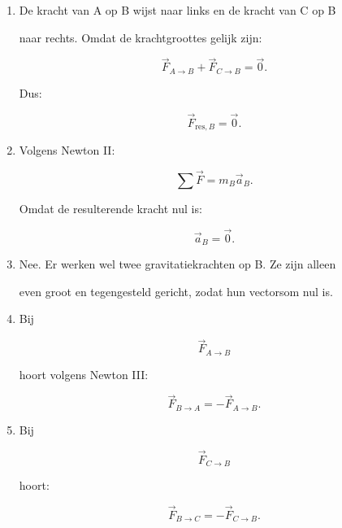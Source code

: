 \documentclass{ximera}
\begin{document}
\begin{oefening}{\oefG}
\begin{oplossing}
\begin{enumerate}

  \item De kracht van A op B wijst naar links en de kracht van C op B

  naar rechts. Omdat de krachtgroottes gelijk zijn:

  \[\vec F_{A\rightarrow B} + \vec F_{C\rightarrow B} = \vec0.\]

  Dus:

  \[\boxed{\vec F_{\mathrm{res},B}=\vec0}.\]

  \item Volgens Newton II:

  \[\sum\vec F=m_B\vec a_B.\]

  Omdat de resulterende kracht nul is:

  \[\boxed{\vec a_B=\vec0}.\]

  \item Nee. Er werken wel twee gravitatiekrachten op B. Ze zijn alleen

  even groot en tegengesteld gericht, zodat hun vectorsom nul is.

  \item Bij

  \[\vec F_{A\rightarrow B}\]

  hoort volgens Newton III:

  \[\boxed{ \vec F_{B\rightarrow A} = -\vec F_{A\rightarrow B} }.\]

  \item Bij

  \[\vec F_{C\rightarrow B}\]

  hoort:

  \[\boxed{ \vec F_{B\rightarrow C} = -\vec F_{C\rightarrow B} }.\]

\end{enumerate}

\end{oplossing}

\end{oefening}
\end{document}
